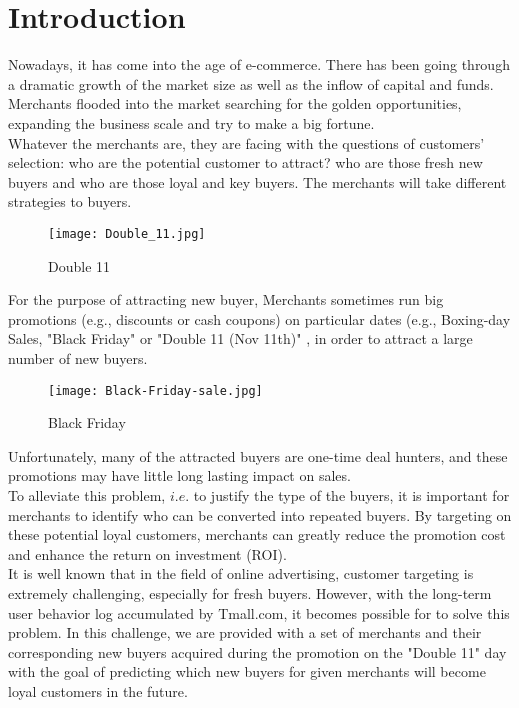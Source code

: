 \documentclass[sigconf]{acmart}
\begin{document}
\section{Introduction}
Nowadays, it has come into the age of e-commerce. There has been going through a dramatic growth of the market size as well as the inflow of capital and funds. Merchants flooded into the market searching for the golden opportunities, expanding the business scale and try to make a big fortune.\\
\indent
Whatever the merchants are, they are facing with the questions of customers' selection: who are the potential customer to attract? who are those fresh new buyers and who are those loyal and key buyers. The merchants will take different strategies to  buyers. \\
\begin{figure}[htbp]
\small
\centering
\texttt{[image: Double\_11.jpg]}
\caption{Double 11} \label{fig: Double 11}
\end{figure}
\indent
For the purpose of attracting new buyer, Merchants sometimes run big promotions (e.g., discounts or cash coupons) on particular dates (e.g., Boxing-day Sales, "Black Friday" or "Double 11 (Nov 11th)" , in order to attract a large number of new buyers.\\
\begin{figure}[htbp]
\small
\centering
\texttt{[image: Black-Friday-sale.jpg]}
\caption{Black Friday} \label{fig: Black Friday}
\end{figure}
\indent
Unfortunately, many of the attracted buyers are one-time deal hunters, and these promotions may have little long lasting impact on sales.\\ To alleviate this problem, $i.e.$ to justify the type of the buyers, it is important for merchants to identify who can be converted into repeated buyers. By targeting on these potential loyal customers, merchants can greatly reduce the promotion cost and enhance the return on investment (ROI). \\
\indent
It is well known that in the field of online advertising, customer targeting is extremely challenging, especially for fresh buyers. However, with the long-term user behavior log accumulated by Tmall.com, it becomes possible for to solve this problem. In this challenge, we are provided with a set of merchants and their corresponding new buyers acquired during the promotion on the "Double 11" day with the goal of predicting which new buyers for given merchants will become loyal customers in the future.\\
\end{document}
